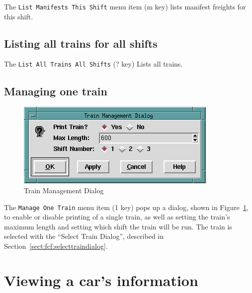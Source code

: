 The \verb=List Manifests This Shift= menu item (m key) lists manifest
freights for this shift.

\subsection{Listing all trains for all shifts}

The \verb=List All Trains All Shifts= (? key) Lists all trains.

\subsection{Managing one train}

\begin{figure}[hbpt]
\begin{centering}
\includegraphics{FCFManage1TrainDialog.png}
\caption{Train Management Dialog}
\label{fig:fcf:manage1train}
\end{centering}
\end{figure}
The \verb=Manage One Train= menu item (1 key) pops up a dialog, shown
in Figure~\ref{fig:fcf:manage1train}, to enable or disable printing of
a single train, as well as setting the train's maximum length and
setting which shift the train will be run.  The train is selected with
the ``Select Train Dialog'', described in
Section~\ref{sect:fcf:selecttraindialog}.

\section{Viewing a car's information}

